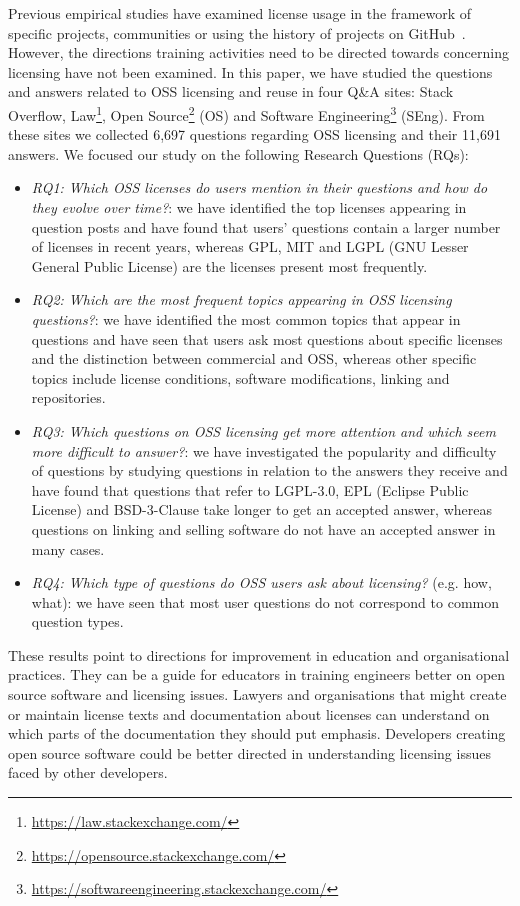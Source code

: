 \documentclass{elsarticle}
\begin{document}
Previous empirical studies have examined license usage in the framework of specific projects, communities or using the history of projects on GitHub~\cite{di2010exploratory,moraes2021one,vendome2017license}. However, the directions training activities need to be directed towards concerning licensing have not been examined. In this paper, we have studied the questions and answers related to OSS licensing and reuse in four Q\&A sites: Stack Overflow, Law\footnote{\url{https://law.stackexchange.com/}}, Open Source\footnote{\url{https://opensource.stackexchange.com/}} (OS) and Software Engineering\footnote{\url{https://softwareengineering.stackexchange.com/}} (SEng). From these sites we collected 6,697 questions regarding OSS licensing and their 11,691 answers. We focused our study on the following Research Questions (RQs):
\begin{itemize}
\item \emph{RQ1: Which OSS licenses do users mention in their questions and how do they evolve over time?}: we have identified the top licenses appearing in question posts and have found that users' questions contain a larger number of licenses in recent years, whereas GPL, MIT and LGPL (GNU Lesser General Public License) are the licenses present most frequently. 
\item \emph{RQ2: Which are the most frequent topics appearing in OSS licensing questions?}: we have identified the most common topics that appear in questions and have seen that users ask most questions about specific licenses and the distinction between commercial and OSS, whereas other specific topics include license conditions, software modifications, linking and repositories.
\item \emph{RQ3: Which questions on OSS licensing get more attention and which seem more difficult to answer?}: we have investigated the popularity and difficulty of questions by studying questions in relation to the answers they receive and have found that questions that refer to LGPL-3.0, EPL (Eclipse Public License) and BSD-3-Clause take longer to get an accepted answer, whereas questions on linking and selling software do not have an accepted answer in many cases.
\item \emph{RQ4: Which type of questions do OSS users ask about licensing?} (e.g. how, what): we have seen that most user questions do not correspond to common question types.
\end{itemize}

These results point to directions for improvement in education and organisational practices. They can be a guide for educators in training engineers better on open source software and licensing issues. Lawyers and organisations that might create or maintain license texts and documentation about licenses can understand on which parts of the documentation they should put emphasis. Developers creating open source software could be better directed in understanding licensing issues faced by other developers.
\end{document}
